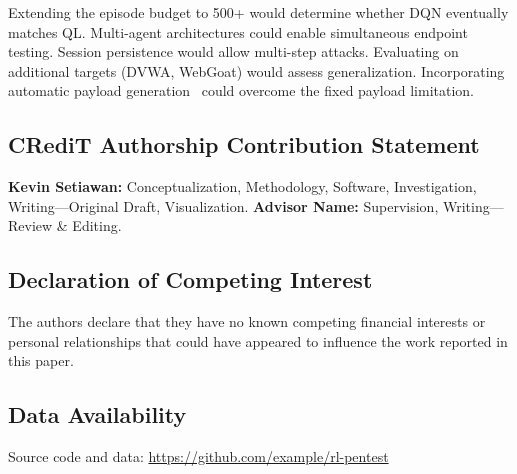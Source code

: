 \documentclass[5p,twocolumn]{elsarticle}
\begin{document}
Extending the episode budget to 500+ would determine whether DQN eventually matches QL. Multi-agent architectures could enable simultaneous endpoint testing. Session persistence would allow multi-step attacks. Evaluating on additional targets (DVWA, WebGoat) would assess generalization. Incorporating automatic payload generation~\cite{yao2023,alwahaibi2023} could overcome the fixed payload limitation.

\subsection*{CRediT Authorship Contribution Statement}

\textbf{Kevin Setiawan:} Conceptualization, Methodology, Software, Investigation, Writing---Original Draft, Visualization. \textbf{Advisor Name:} Supervision, Writing---Review \& Editing.

\subsection*{Declaration of Competing Interest}

The authors declare that they have no known competing financial interests or personal relationships that could have appeared to influence the work reported in this paper.

\subsection*{Data Availability}

Source code and data: \url{https://github.com/example/rl-pentest}
\end{document}
